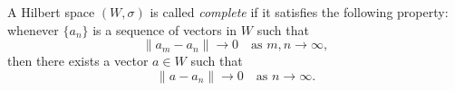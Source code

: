 A Hilbert space $(W, \sigma)$ is called \emph{complete} if it satisfies the following property: whenever $\{a_n\}$ is a sequence of vectors in $W$ such that
$$
\|a_m - a_n\| \to 0 \quad \text{as } m, n \to \infty,
$$
then there exists a vector $a \in W$ such that
$$
\|a - a_n\| \to 0 \quad \text{as } n \to \infty.
$$
